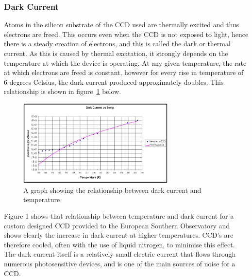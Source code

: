 	\subsubsection{Dark Current} %
	\label{ssub:dark_current}
		Atoms in the silicon substrate of the CCD used are thermally excited and thus electrons are freed. This occurs even when the CCD is not exposed to light, hence there is a steady creation of electrons, and this is called the dark or thermal current. As this is caused by thermal excitation, it strongly depends on the temperature at which the device is operating. At any given temperature, the rate at which electrons are freed is constant, however for every rise in temperature of 6 degrees Celsius, the dark current produced approximately doubles\cite[p.~124--125]{Astronomical_Image_Processing}. This relationship is shown in figure~\ref{fig:dark_current} below\cite{Southern_Observatory_throughput}.
		\begin{figure}[ht]
			\centering
			\includegraphics[width=0.7\textwidth]{../Images/Dark.png}
			\caption{A graph showing the relationship between dark current and temperature}\label{fig:dark_current}
		\end{figure}

		Figure 1 shows that relationship between temperature and dark current for a custom designed CCD provided to the European Southern Observatory and shows clearly the increase in dark current at higher temperatures. CCD’s are therefore cooled, often with the use of liquid nitrogen, to minimise this effect. The dark current itself is a relatively small electric current that flows through numerous photosensitive devices, and is one of the main sources of noise for a CCD.

